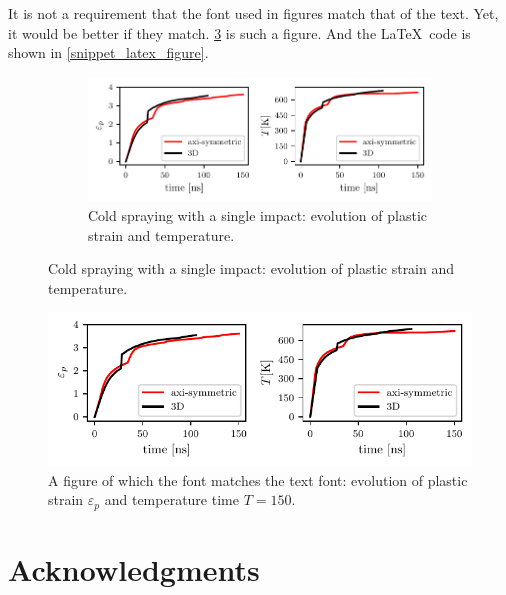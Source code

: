 \documentclass[authoryear,3p,times,preprint,review,fleqn]{elsarticle}
\numberwithin{equation}{section}
\theoremstyle{remark}
\begin{document}
It is not a requirement that the font used in figures match that of the text. Yet, it would be better if they match. \cref{fig:cold-spray-plot} is such a figure. And the \LaTeX\ code is shown in \cref{snippet_latex_figure}.

\begin{figure}[!h]
  \begin{snippetlatex}[caption={Input file for the plate penetration problem.},label={snippet_latex_figure},framerule=1pt,tabsize=3]
    \begin{figure}[!ht]
      \centering
      \includegraphics{cold-spray-plots}
      \caption{Cold spraying with a single impact: evolution of plastic strain and temperature.}
      \label{fig:cold-spray-plot}
    \end{figure}
  \end{snippetlatex}
\end{figure}

\begin{figure}[!ht]
  \centering
  \includegraphics{cold-spray-plots}
  \caption{A figure of which the font matches the text font: 
  evolution of plastic strain $\varepsilon_p$ and temperature time $T=150$.}
  \label{fig:cold-spray-plot}
\end{figure}

%
\section*{Acknowledgments}
\end{document}
